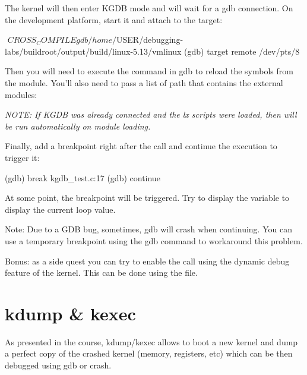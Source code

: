 The kernel will then enter KGDB mode and will wait for a gdb connection. On the
development platform, start it and attach to the target:

\begin{bashinput}$
$ ${CROSS_COMPILE}gdb /home/$USER/debugging-labs/buildroot/output/build/linux-5.13/vmlinux
(gdb) target remote /dev/pts/8
\end{bashinput}

Then you will need to execute the  command in gdb to reload the
symbols from the module. You'll also need to pass a list of path that contains
the external modules:


{\em NOTE: If KGDB was already connected and the lx scripts were loaded, then
 will be run automatically on module loading.}

Finally, add a breakpoint right after the  call and continue
the execution to trigger it:

\begin{bashinput}
(gdb) break kgdb_test.c:17
(gdb) continue
\end{bashinput}

At some point, the breakpoint will be triggered. Try to display the variable
 to display the current loop value.

Note: Due to a GDB bug, sometimes, gdb will crash when continuing. You can
use a temporary breakpoint using the gdb  command to workaround
this problem.

Bonus: as a side quest you can try to enable the  call using
the dynamic debug feature of the kernel. This can be done using the
 file.

\section{kdump \& kexec}

As presented in the course, kdump/kexec allows to boot a new kernel and dump a
perfect copy of the crashed kernel (memory, registers, etc) which can be then
debugged using gdb or crash. 

